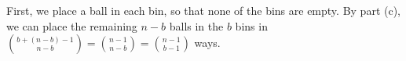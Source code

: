First, we place a ball in each bin, so that none of the bins are empty.
By part (c), we can place the remaining $n-b$ balls in the $b$ bins in $\binom{b+(n-b)-1}{n-b}=\binom{n-1}{n-b}=\binom{n-1}{b-1}$ ways.

